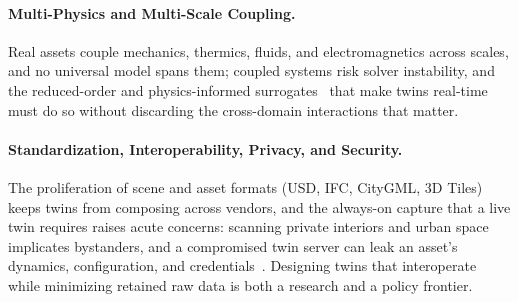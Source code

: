 \paragraph{Multi-Physics and Multi-Scale Coupling.} Real assets couple mechanics, thermics, fluids, and electromagnetics across scales, and no universal model spans them; coupled systems risk solver instability, and the reduced-order and physics-informed surrogates~\cite{hartmann2018model,raissi2019physics} that make twins real-time must do so without discarding the cross-domain interactions that matter.

\paragraph{Standardization, Interoperability, Privacy, and Security.} The proliferation of scene and asset formats (USD, IFC, CityGML, 3D Tiles) keeps twins from composing across vendors, and the always-on capture that a live twin requires raises acute concerns: scanning private interiors and urban space implicates bystanders, and a compromised twin server can leak an asset's dynamics, configuration, and credentials~\cite{wang2023survey}. Designing twins that interoperate while minimizing retained raw data is both a research and a policy frontier.
